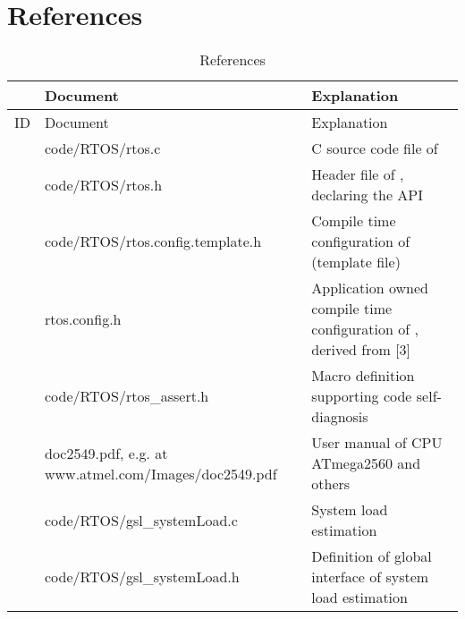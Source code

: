\chapter*{References}
\label{secDocReferences}

\def\refRTOSC{[1]}
\def\refRTOSH{[2]}
\def\refRTOSConfigTemplateH{[3]}
\def\refRTOSConfigH{[4]}
\def\refRTOSAssertH{[5]}
\def\refATmegaManual{[6]}
\def\refGSLSystemLoadC{[7]}
\def\refGSLSystemLoadH{[8]}

\begin{longtable}[c]{|c|p{5.5cm}|p{8.0cm}|}
\hline
& Document & Explanation \\ \hline
\endfirsthead
\hline
ID & Document & Explanation \\ \hline
\hline
\endhead
\caption[]{References (continued on next page)}
\endfoot
\caption{References} \label{tabDocReferences}
\endlastfoot
\hline
\refRTOSC & code/RTOS/rtos.c
          & C source code file of \rtos{}
\\ \hline
\refRTOSH & code/RTOS/rtos.h
          & Header file of \rtos{}, declaring the API
\\ \hline
\refRTOSConfigTemplateH & code/RTOS/rtos.\-config.\-tem\-plate.h 
                        & Compile time configuration of \rtos{} (template file)
\\ \hline
\refRTOSConfigH & rtos.config.h
                & Application owned compile time configuration of \rtos{}, derived
                  from \refRTOSConfigTemplateH
\\ \hline
\refRTOSAssertH & code/RTOS/rtos\-\_assert.h
                & Macro definition supporting code self-diagnosis
\\ \hline
\refATmegaManual & doc2549.pdf, e.g. at www.\-atmel.\-com/\-Ima\-ges/\-doc\-2549.pdf
                 & User manual of CPU ATmega2560 and others
\\ \hline
\refGSLSystemLoadC 
  & code/RTOS/gsl\-\_sys\-tem\-Load.c
  & System load estimation
\\ \hline
\refGSLSystemLoadH
  & code/RTOS/gsl\-\_sys\-tem\-Load.h
  & Definition of global interface of system load estimation
\\ \hline
\end{longtable}


